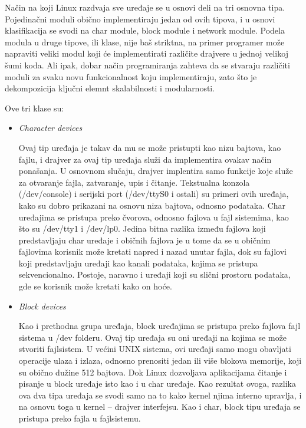 \documentclass[a4paper, 12pt, diplomski]{etf}
\begin{document}
	Način na koji Linux razdvaja sve uređaje se u osnovi deli na tri osnovna tipa. Pojedinačni moduli obično implementiraju jedan od ovih tipova, i u osnovi klasifikacija se svodi na char module, block module i network module. Podela modula u druge tipove, ili klase, nije baš striktna, na primer programer može napraviti veliki modul koji će implementirati različite drajvere u jednoj velikoj šumi koda. Ali ipak, dobar način programiranja zahteva da se stvaraju različiti moduli za svaku novu funkcionalnost koju implementiraju, zato što je dekompozicija ključni elemnt skalabilnosti i modularnosti.

	Ove tri klase su:

	\begin{itemize}

		\item \textit{Character devices}

	Ovaj tip uređaja je takav da mu se može pristupti kao nizu bajtova, kao fajlu, i drajver za ovaj tip uređaja služi da implementira ovakav način ponašanja. U osnovnom slučaju, drajver implentira samo funkcije koje služe za otvaranje fajla, zatvaranje, upis i čitanje. Tekstualna konzola (/dev/console) i serijski port (/dev/ttyS0 i ostali) su primeri ovih uređaja, kako su dobro prikazani na osnovu niza bajtova, odnosno podataka. Char uređajima se pristupa preko čvorova, odnosno fajlova u fajl sistemima, kao što su /dev/tty1 i /dev/lp0. Jedina bitna razlika između fajlova koji predstavljaju char uređaje i običnih fajlova je u tome da se u običnim fajlovima korisnik može kretati napred i nazad unutar fajla, dok su fajlovi koji predstavljaju uređaji kao kanali podataka, kojima se pristupa sekvencionalno. Postoje, naravno i uređaji koji su slični prostoru podataka, gde se korisnik može kretati kako on hoće.

		\item \textit{Block devices}

	Kao i prethodna grupa uređaja, block uređajima se pristupa preko fajlova fajl sistema u /dev folderu. Ovaj tip uređaja su oni uređaji na kojima se može stvoriti fajlsistem. U većini UNIX sistema, ovi uređaji samo mogu obavljati operacije ulaza i izlaza, odnosno prenositi jedan ili više blokova memorije, koji su obično dužine 512 bajtova. Dok Linux dozvoljava aplikacijama čitanje i pisanje u block uređaje isto kao i u char uređaje. Kao rezultat ovoga, razlika ova dva tipa uređaja se svodi samo na to kako kernel njima interno upravlja, i na osnovu toga u kernel – drajver interfejsu. Kao i char, block tipu uređaja se pristupa preko fajla u fajlsistemu.


\end{itemize}
\end{document}
